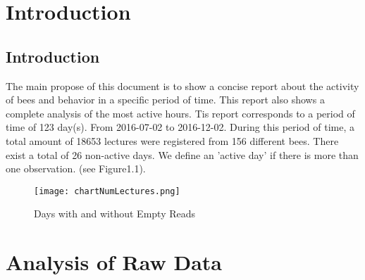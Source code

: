 \documentclass[11pt,fleqn]{book} %
\begin{document}


\pagestyle{empty} %

\tableofcontents %


\pagestyle{fancy} %


\chapter{Introduction}

\normalsize%
\section*{Introduction}%
The main propose of this document  is to show a concise report about the activity of bees and behavior in a specific period of time. This report also shows a complete analysis of the most active hours.\newline%
\newline%
Tis report corresponds to a period of time of 123 day(s). From 2016{-}07{-}02 to 2016{-}12{-}02. During this period of time, a total amount of 18653 lectures were registered from 156 different bees. There exist a total of 26 non{-}active days. We define an 'active day' if there is more than one observation. (see Figure1.1).\newline%
\newline%
%


\begin{figure}[h!]%
\centering%
\texttt{[image: chartNumLectures.png]}%
\caption{Days with and without Empty Reads}%
\end{figure}


\chapter{Analysis of Raw Data}
\normalsize%
\end{document}
